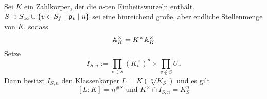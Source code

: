 \Satz{}
Sei $K$ ein Zahlkörper, der die $n$-ten Einheitswurzeln enthält. $S \supset S_\infty \cup \{ v \in S_f ~|~ \mathfrak{p}_v \mid n \}$ sei eine hinreichend große, aber endliche Stellenmenge von $K$, sodass
\[ \mathbb{A}_K^\times = K^\times \mathbb{A}_K^\times \]
Setze
\[ I_{S,n} := \prod_{v\in S} (K^\times_v)^n \times \prod_{v\not\in S}U_v \]
Dann besitzt $I_{S,n}$ den Klassenkörper $L = K(\sqrt[n]{K_S})$ und es gilt
\[ [L:K] = n^{\# S} \text{ und } K^\times \cap I_{S,n} =K_S^n \]
